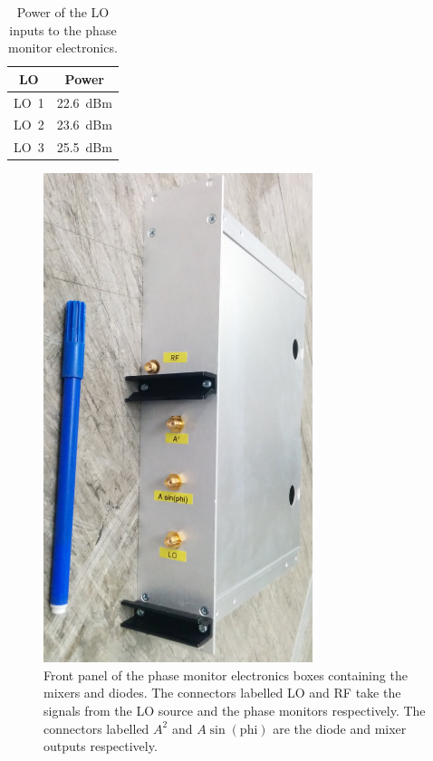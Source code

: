 \begin{table}
  \begin{center}
    \begin{tabular}{|c c|}
	   \hline
       LO & Power \\ \hline
       LO~1 & 22.6~dBm \\
       LO~2 & 23.6~dBm \\
       LO~3 & 25.5~dBm \\ \hline
    \end{tabular}
    \caption{Power of the LO inputs to the phase monitor electronics.}
  	\label{t:loPowers}
  \end{center}
\end{table}

\begin{figure}
  \centering
  \includegraphics[width=0.7\textwidth]{Figures/phaseMons/mixerFrontPanel}
  \caption{Front panel of the phase monitor electronics boxes containing the mixers and diodes. The connectors labelled LO and RF take the signals from the LO source and the phase monitors respectively. The connectors labelled \(A^2\) and \(A\sin(\mathrm{phi})\) are the diode and mixer outputs respectively.}
  \label{f:mixerFrontPanel}
\end{figure}

